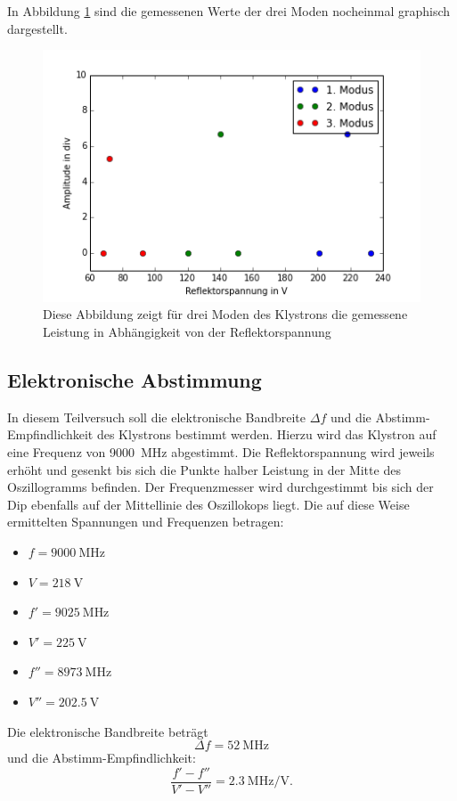 \documentclass[a4paper]{article}
\begin{document}
\noindent
In Abbildung \ref{modeplot} sind die gemessenen Werte der drei Moden nocheinmal graphisch dargestellt.

\begin{figure}[h]
\centering
\includegraphics[scale = 0.7]{mode_plot.png}
\caption{Diese Abbildung zeigt für drei Moden des Klystrons die gemessene Leistung in Abhängigkeit von der Reflektorspannung}
\label{modeplot}
\end{figure}



\subsection{Elektronische Abstimmung}
In diesem Teilversuch soll die elektronische Bandbreite $\Delta f$ und die Abstimm-Empfindlichkeit des Klystrons bestimmt werden.
Hierzu wird das Klystron auf eine Frequenz von \SI{9000}{\mega\hertz} abgestimmt. 
Die Reflektorspannung wird jeweils erhöht und gesenkt bis sich die Punkte halber Leistung in der Mitte des Oszillogramms befinden.
Der Frequenzmesser wird durchgestimmt bis sich der Dip ebenfalls auf der Mittellinie des Oszillokops liegt. 
Die auf diese Weise ermittelten Spannungen und Frequenzen betragen:
\begin{itemize}
\item $f = \SI{9000}{\mega\hertz}$
\item $V = \SI{218}{\volt}$
\item $f' = \SI{9025}{\mega\hertz}$
\item $V' = \SI{225}{\volt}$
\item $f'' = \SI{8973}{\mega\hertz}$
\item $V'' = \SI{202,5}{\volt}$
\end{itemize}
Die elektronische Bandbreite beträgt
\[
\Delta f = \SI{52}{\mega\hertz}
\]
und die Abstimm-Empfindlichkeit:
\[
\frac{f' - f''}{V' - V''} = \SI{2,3}{\mega\hertz\per\volt}.
\]
\end{document}

